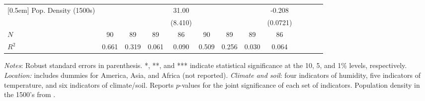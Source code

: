 \begin{sidewaystable}[h!]
\begin{threeparttable}
\begin{center}
\begin{minipage}{\textwidth}
\begin{tabular*}{\textwidth}{@{\extracolsep{\fill}}lcccccccccccc@{\extracolsep{\fill}}}
[0.5em]
Pop. Density (1500s)    &                     &                     &                     &       31.00\sym{***}&                     &                     &                     &      -0.208\sym{***}\\
            &                     &                     &                     &     (8.410)         &                     &                     &                     &    (0.0721)         \\
\hline
\(N\)       &          90         &          89         &          89         &          86         &          90         &          89         &          89         &          86         \\
\(R^{2}\)   &       0.661         &       0.319         &       0.061         &       0.090         &       0.509         &       0.256         &       0.030         &       0.064         \\

\hline
\end{tabular*}
\begin{tablenotes}
\small
\item \textit{Notes}: Robust standard errors in parenthesis. *, **, and *** indicate statistical significance at the 10, 5, and 1\% levels, respectively. \textit{Location:} includes dummies for America, Asia, and Africa (not reported). \textit{Climate and soil}: four indicators of humidity, five indicators of temperature, and six indicators of climate/soil. Reports $p$-values for the joint significance of each set of indicators. Population density in the 1500's from \cite{acemoglu2002reversal}.
\end{tablenotes}
\end{minipage}
\end{center}
\end{threeparttable}
\end{sidewaystable}